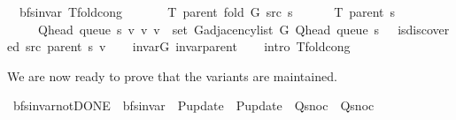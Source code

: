 \begin{isabellebody}
{\isafoldproof}%
%
\isadelimproof
\isanewline
%
\endisadelimproof
\isanewline
{}\isamarkupfalse%
\ {\isacharparenleft}{\kern0pt}\ bfs{\isacharunderscore}{\kern0pt}invar{\isacharparenright}{\kern0pt}\ T{\isacharunderscore}{\kern0pt}fold{\isacharunderscore}{\kern0pt}cong{\isacharcolon}{\kern0pt}\isanewline
\ \ \isanewline
\ \ \ \ {\isachardoublequoteopen}T\ {\isacharparenleft}{\kern0pt}parent\ {\isacharparenleft}{\kern0pt}fold\ G\ src\ s{\isacharparenright}{\kern0pt}{\isacharparenright}{\kern0pt}\ {\isacharequal}{\kern0pt}\isanewline
\ \ \ \ \ T\ {\isacharparenleft}{\kern0pt}parent\ s{\isacharparenright}{\kern0pt}\ {\isasymunion}\isanewline
\ \ \ \ \ {\isacharbraceleft}{\kern0pt}{\isacharparenleft}{\kern0pt}Q{\isacharunderscore}{\kern0pt}head\ {\isacharparenleft}{\kern0pt}queue\ s{\isacharparenright}{\kern0pt}{\isacharcomma}{\kern0pt}\ v{\isacharparenright}{\kern0pt}\ {\isacharbar}{\kern0pt}v{\isachardot}{\kern0pt}\ v\ {\isasymin}\ set\ {\isacharparenleft}{\kern0pt}G{\isachardot}{\kern0pt}adjacency{\isacharunderscore}{\kern0pt}list\ G\ {\isacharparenleft}{\kern0pt}Q{\isacharunderscore}{\kern0pt}head\ {\isacharparenleft}{\kern0pt}queue\ s{\isacharparenright}{\kern0pt}{\isacharparenright}{\kern0pt}{\isacharparenright}{\kern0pt}\ {\isasymand}\ {\isasymnot}\ is{\isacharunderscore}{\kern0pt}discovered\ src\ {\isacharparenleft}{\kern0pt}parent\ s{\isacharparenright}{\kern0pt}\ v{\isacharbraceright}{\kern0pt}{\isachardoublequoteclose}\isanewline
%
\isadelimproof
\ \ %
\endisadelimproof
%
\isatagproof
{}\isamarkupfalse%
\ invar{\isacharunderscore}{\kern0pt}G\ invar{\isacharunderscore}{\kern0pt}parent\isanewline
\ \ \isamarkupfalse%
\ {\isacharparenleft}{\kern0pt}intro\ T{\isacharunderscore}{\kern0pt}fold{\isacharunderscore}{\kern0pt}cong{\isacharunderscore}{\kern0pt}{}{\isacharparenright}{\kern0pt}%
\endisatagproof
{\isafoldproof}%
%
\isadelimproof
%
\endisadelimproof
%
\begin{isamarkuptext}%
We are now ready to prove that the variants are maintained.%
\end{isamarkuptext}\isamarkuptrue%
\isamarkupfalse%
\ bfs{\isacharunderscore}{\kern0pt}invar{\isacharunderscore}{\kern0pt}not{\isacharunderscore}{\kern0pt}DONE\ {\isacharequal}{\kern0pt}\ bfs{\isacharunderscore}{\kern0pt}invar\ \ P{\isacharunderscore}{\kern0pt}update\ {\isacharequal}{\kern0pt}\ P{\isacharunderscore}{\kern0pt}update\ \ Q{\isacharunderscore}{\kern0pt}snoc\ {\isacharequal}{\kern0pt}\ Q{\isacharunderscore}{\kern0pt}snoc\ \isanewline

\end{isabellebody}
